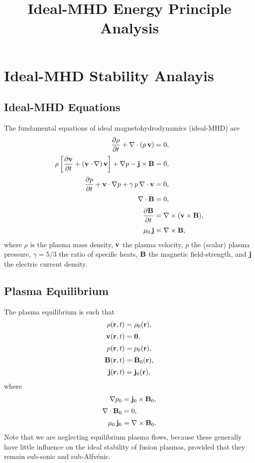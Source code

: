 \documentclass[12pt,prb,aps,notitlepage]{revtex4-1}
\begin{document}
\title{Ideal-MHD Energy Principle Analysis}
\maketitle

\section{Ideal-MHD Stability Analayis}
\subsection{Ideal-MHD Equations}
The fundamental  equations of ideal magnetohydrodynamics (ideal-MHD) are
\begin{align}
\frac{\partial\rho}{\partial t} + \nabla\cdot(\rho\,{\bf v}) & =0,\label{e1}\\[0.5ex]
\rho\left[\frac{\partial{\bf v}}{\partial t} + ({\bf v}\cdot\nabla)\,{\bf v}\right]+\nabla p - {\bf j}\times {\bf B}&=0,\label{e2}\\[0.5ex]
\frac{\partial p}{\partial t}+{\bf v}\cdot\nabla p + \gamma\,p\,\nabla\cdot{\bf v} &=0,\label{e3}\\[0.5ex]
\nabla\cdot{\bf B} &=0,\\[0.5ex]
\frac{\partial {\bf B}}{\partial t} &= \nabla\times({\bf v}\times {\bf B}),\label{e4}\\[0.5ex]
\mu_0\,{\bf j} &= \nabla\times {\bf B},\label{e5}
\end{align}
where $\rho$ is the plasma mass density, ${\bf v}$ the plasma velocity, $p$ the (scalar) plasma pressure, $\gamma=5/3$ the ratio of specific heats,
${\bf B}$ the magnetic field-strength, and ${\bf j}$ the electric current density. 

\subsection{Plasma Equilibrium}
The plasma equilibrium is such that
\begin{align}
\rho({\bf r},t) &= \rho_0({\bf r}),\\[0.5ex]
{\bf v}({\bf r},t) &= {\bf 0},\label{e7}\\[0.5ex]
p({\bf r},t) &= p_0({\bf r}),\\[0.5ex]
{\bf B}({\bf r},t) &= {\bf B}_0({\bf r}),\\[0.5ex]
{\bf j}({\bf r},t) &= {\bf j}_0({\bf r}),
\end{align}
where
\begin{align}
\nabla p_0 &= {\bf j}_0\times {\bf B}_0,\label{e11}\\[0.5ex]
\nabla\cdot{\bf B}_0&= 0,\label{e6}\\[0.5ex]
\mu_0\,{\bf j}_0 &= \nabla\times {\bf B}_0.\label{e12}
\end{align}
Note that we are neglecting equilibrium plasma flows, because these generally have little influence on the ideal stability of fusion plasmas, provided that they remain sub-sonic and sub-Alfv\'{e}nic. 
\end{document}
